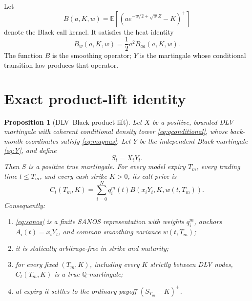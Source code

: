 \documentclass[11pt,a4paper]{article}
\newtheorem{proposition}[theorem]{Proposition}
\newcommand{\Q}{\mathbb Q}
\newcommand{\E}{\mathbb E}
\begin{document}
Let
\begin{equation}
 B(a,K,w)=\E[(ae^{-w/2+\sqrt w Z}-K)^+]
 \label{eq:black}
\end{equation}
denote the Black call kernel.  It satisfies the heat identity
\begin{equation}
 B_w(a,K,w)=\frac12a^2B_{aa}(a,K,w).
 \label{eq:heat}
\end{equation}
The function $B$ is the smoothing operator; $Y$ is the martingale whose
conditional transition law produces that operator.

\section{Exact product-lift identity}

\begin{proposition}[DLV--Black product lift]
\label{thm:product}
Let $X$ be a positive, bounded DLV martingale with coherent conditional
density tower \eqref{eq:qconditional}, whose back-month coordinates satisfy
\eqref{eq:magnus}.  Let $Y$ be the independent Black martingale
\eqref{eq:Y}, and define
\begin{equation}
 S_t=X_tY_t.
 \label{eq:S}
\end{equation}
Then $S$ is a positive true martingale.  For every model expiry $T_m$, every
trading time $t\leq T_m$, and every cash strike $K>0$, its call price is
\begin{equation}
 \boxed{
 C_t(T_m,K)=
 \sum_{i=0}^{N}q_i^m(t)
 B\!\left(x_iY_t,K,w(t,T_m)\right).}
 \label{eq:sanos}
\end{equation}
Consequently:
\begin{enumerate}[label=(\roman*)]
\item \eqref{eq:sanos} is a finite SANOS representation with weights $q_i^m$,
anchors $A_i(t)=x_iY_t$, and common smoothing variance $w(t,T_m)$;
\item it is statically arbitrage-free in strike and maturity;
\item for every fixed $(T_m,K)$, including every $K$ strictly between DLV
nodes, $C_t(T_m,K)$ is a true $\Q$-martingale;
\item at expiry it settles to the ordinary payoff $(S_{T_m}-K)^+$.
\end{enumerate}
\end{proposition}
\end{document}
